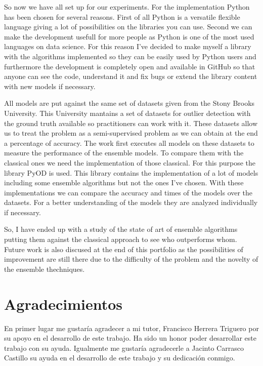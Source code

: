 So now we have all set up for our experiments. For the implementation Python has been chosen for several reasons. First of all Python is a versatile flexible language giving a lot of possibilities on the libraries you can use. Second we can make the development usefull for more people as Python is one of the most used languages on data science. For this reason I've decided to make myself a library with the algorithms implemented so they can be easily used by Python users and furthermore the development is completely open and available in GitHub so that anyone can see the code, understand it and fix bugs or extend the library content with new models if necessary.

All models are put against the same set of datasets given from the Stony Brooks University. This University mantains a set of datasets for outlier detection with the ground truth available so practitioners can work with it. These datasets allow us to treat the problem as a semi-supervised problem as we can obtain at the end a percentage of accuracy. The work first executes all models on these datasets to measure the performance of the ensemble models. To compare them with the classical ones we need the implementation of those classical. For this purpose the library PyOD is used. This library contains the implementation of a lot of models including some ensemble algorithms but not the ones I've chosen. With these implementations we can compare the accuracy and times of the models over the datasets. For a better understanding of the models they are analyzed individually if necessary.

So, I have ended up with a study of the state of art of ensemble algorithms putting them against the classical approach to see who outperforms whom. Future work is also discused at the end of this portfolio as the possibilities of improvement are still there due to the difficulty of the problem and the novelty of the ensemble thechniques.

\chapter*{Agradecimientos}
\thispagestyle{empty}

En primer lugar me gustaría agradecer a mi tutor, Francisco Herrera Triguero por su apoyo en el desarrollo de este trabajo. Ha sido un honor poder desarrollar este trabajo con su ayuda. Igualmente me gustaría agradecerle a Jacinto Carrasco Castillo su ayuda en el desarrollo de este trabajo y su dedicación conmigo.

